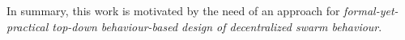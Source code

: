 In summary,
 this work is motivated by the need of an
 approach for \emph{formal-yet-practical top-down behaviour-based design of decentralized swarm behaviour}.


%

